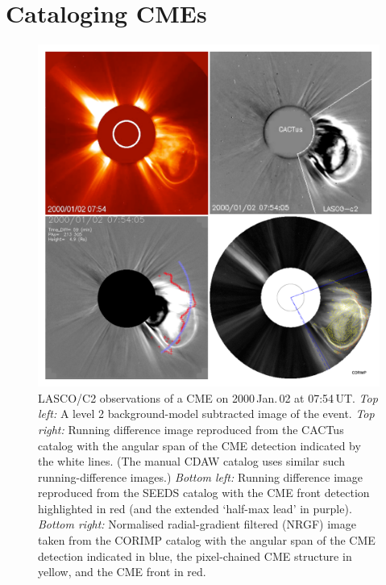 \documentclass[referee,a4paper,12pt,traditabstract]{swsc}
\begin{document}
\section{Cataloging CMEs}
\label{sect_catalogs}

\begin{figure}[!h]
\centerline{\includegraphics[width=\linewidth]{20000102_four.pdf}}
\caption{LASCO/C2 observations of a CME on 2000\,Jan.\,02 at 07:54\,UT. \emph{Top left:} A level 2 background-model subtracted image of the event. \emph{Top right:} Running difference image reproduced from the CACTus catalog with the angular span of the CME detection indicated by the white lines. (The manual CDAW catalog uses similar such running-difference images.) \emph{Bottom left:} Running difference image reproduced from the SEEDS catalog with the CME front detection highlighted in red (and the extended `half-max lead' in purple). \emph{Bottom right:} Normalised radial-gradient filtered (NRGF) image taken from the CORIMP catalog with the angular span of the CME detection indicated in blue, the pixel-chained CME structure in yellow, and the CME front in red.}
\label{20000102_four}
\end{figure}
\end{document}
